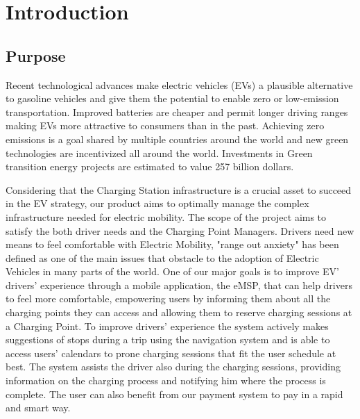 \documentclass{Configuration_Files/PoliMi3i_thesis}
\begin{document}
\mainmatter %

\chapter{Introduction}

\section{Purpose}
Recent technological advances make electric vehicles (EVs) a plausible alternative to gasoline vehicles and give them the potential to enable zero or low-emission transportation. Improved batteries are cheaper and permit longer driving ranges making EVs more attractive to consumers than in the past.
Achieving zero emissions is a goal shared by multiple countries around the world and new green technologies are incentivized all around the world. Investments in  Green transition energy projects are estimated to value 257 billion dollars. 

Considering that the Charging Station infrastructure is a crucial asset to succeed in the EV strategy, our product aims to optimally manage the complex infrastructure needed for electric mobility. 
The scope of the project aims to satisfy the both driver needs and the Charging Point Managers. 
Drivers need new means to feel comfortable with Electric Mobility, "range out anxiety" has been defined as one of the main issues that obstacle to the adoption of Electric Vehicles in many parts of the world.
One of our major goals is to improve EV' drivers' experience through a mobile application, the eMSP, that can help drivers to feel more comfortable, empowering users by informing them about all the charging points they can access and allowing them to reserve charging sessions at a Charging Point. To improve drivers' experience the system actively makes suggestions of stops during a trip using the navigation system and is able to access users' calendars to prone charging sessions that fit the user schedule at best. 
The system assists the driver also during the charging sessions, providing information on the charging process and notifying him where the process is complete. The user can also benefit from our payment system to pay in a rapid and smart way. 
\end{document}
